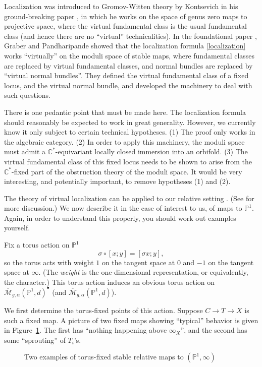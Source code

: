 \documentclass[12pt,letterpaper]{amsart}
\newcommand{\C}{\mathbb{C}}
\newcommand{\proj}{\mathbb P}
\newcommand{\cm}{{\mathcal{M}}}
\newcommand{\cmbar}{\overline{\cm}}
\newcommand{\al}{\alpha}
\newcommand{\si}{\sigma}
\newcommand{\dis}{\bullet}
\newcommand{\lremind}[1]{{\bf[label:  #1]}}
\renewcommand{\lremind}[1]{{}}
\begin{document}
{Localization was introduced to Gromov-Witten theory by Kontsevich in
his ground-breaking paper \cite{kratcurves}, in which he works on the
space of genus zero maps to projective space, where the virtual
fundamental class is the usual fundamental class (and hence there are
no ``virtual'' technicalities).  In the foundational paper \cite{vl},
Graber and Pandharipande showed that the localization formula
\eqref{localization} works ``virtually'' on the moduli space of
stable maps, where fundamental classes are replaced by virtual
fundamental classes, and normal bundles are replaced by ``virtual
normal bundles''.  They defined the virtual fundamental class of a
fixed locus, and the virtual normal bundle, and developed the
machinery to deal with such questions.

There is one pedantic point that must be made here.  The localization
formula should reasonably be expected to work in great generality.
However, we currently know it only subject to certain technical
hypotheses.  (1) The proof only works in the algebraic category.  (2)
In order to apply this machinery, the moduli space must admit 
a $\C^*$-equivariant locally closed immersion
into an orbifold.  (3) The virtual fundamental class of this fixed
locus needs to be shown to arise from the $\C^*$-fixed part of the
obstruction theory of the moduli space.  It would be very interesting,
and potentially important, to remove  hypotheses (1) and (2).

The theory of virtual localization can be applied to our relative
setting \cite{thmstar}.  (See \cite{llz} for more discussion.)  We now
describe it in the case of interest to us, of maps to $\proj^1$.
Again, in order to understand this properly, you should work out
examples yourself.

Fix a torus action on $\proj^1$
$$\si \circ [x;y] = [\si x ; y],$$ so the torus
acts with weight $1$ on the tangent space at $0$ and $-1$ on
the tangent space at $\infty$.
(The {\em weight} is the one-dimensional representation, or equivalently,
the character.)  This torus action
induces an obvious torus action on $\cmbar_{g, \al}(\proj^1, d)^{\dis}$
(and $\cmbar_{g, \al}(\proj^1, d)$).

We first determine the torus-fixed points of this action.  Suppose $C
\rightarrow T \rightarrow X$ is such a fixed map. A picture of two
fixed maps showing ``typical'' behavior is given in
Figure~\ref{fixed}.  The first has ``nothing happening above
$\infty_X$'', and the second has some ``sprouting'' of $T_i$'s.
\begin{figure}
\begin{center}

\end{center}
\caption{Two examples of torus-fixed stable relative maps to $(\proj^1, \infty)$
\lremind{fixed} }\label{fixed}
\end{figure}

}
\end{document}
